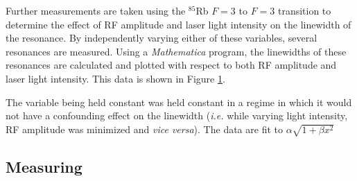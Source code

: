 Further measurements are taken using the $^{85}$Rb $F=3$ to $F=3$ transition to determine the effect of RF amplitude and laser light intensity on the linewidth of the resonance. By independently varying either of these variables, several resonances are measured.  Using a \emph{Mathematica} program, the linewidths of these resonances are calculated and plotted with respect to both RF amplitude and laser light intensity.  This data is shown in Figure \ref{fig:linewidths}.
\begin{figure}[h!]
\begin{center}
\hspace{-1mm}
\vspace{-2mm}
\vspace{-2mm}
\caption{\small{}}
\label{fig:linewidths}
\end{center}
\end{figure}
The variable being held constant was held constant in a regime in which it would not have a confounding effect on the linewidth (\emph{i.e.} while varying light intensity, RF amplitude was minimized and \emph{vice versa}). 
The data are fit to $\alpha\sqrt{1+\beta x^{2}}$ 


\subsection{Measuring}

